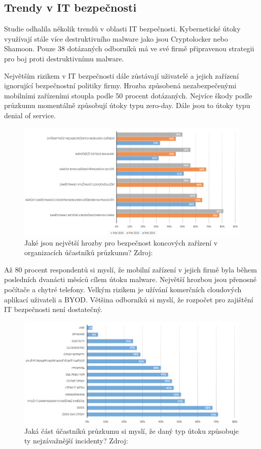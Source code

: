 \subsection{Trendy v IT bezpečnosti}

Studie   odhalila několik trendů v oblasti IT bezpečnosti. Kybernetické útoky využívají stále více destruktivního malware jako jsou Cryptolocker nebo Shamoon. Pouze 38 dotázaných odborníků má ve své firmě připravenou strategii pro boj proti destruktivnímu malware.

Největším rizikem v IT bezpečnosti dále zůstávají uživatelé a jejich zařízení ignorující bezpečnostní politiky firmy. Hrozba způsobená nezabezpečenými mobilními zařízeními stoupla podle 50 procent dotázaných. Nejvíce škody podle průzkumu momentálně způsobují útoky typu zero-day. Dále jsou to útoky typu denial of service.

\begin{figure}[h!]\label{hrozby}
\centering
\includegraphics[width=14cm]{img/hrozby}
\caption{Jaké jsou největší hrozby pro bezpečnost koncových zařízení v organizacích účastníků průzkumu? Zdroj: } 
\end{figure}

Až 80 procent respondentů si myslí, že mobilní zařízení v jejich firmě byla během posledních dvanácti měsíců cílem útoku malware. Největší hrozbou jsou přenosné počítače a chytré telefony. Velkým rizikem je užívání komerčních cloudových aplikací uživateli a BYOD. Většina odborníků si myslí, že rozpočet pro zajištění IT bezpečnosti není dostatečný. 

\begin{figure}[h!]\label{hrozbyUtoky}
\centering
\includegraphics[width=14cm]{img/hrozbyUtoky}
\caption{Jaká část účastníků průzkumu si myslí, že daný typ útoku způsobuje ty nejzávažnější incidenty? Zdroj: } 
\end{figure}


